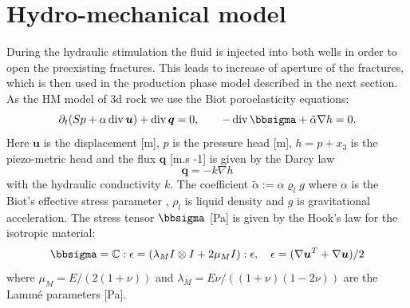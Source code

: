 \documentclass{article}
\newcommand{\CC}{\mathbb C}
\renewcommand{\div}{\operatorname{div}}
\newcommand{\eq}[1]{\begin{equation}#1\end{equation}}
\newcommand{\uu}{\vc u}
\newcommand{\vc}[1]{\boldsymbol{#1}}
\begin{document}
\section{Hydro-mechanical model}
\label{sc:hm_model}
During the hydraulic stimulation the fluid is injected into both wells in order to open the preexisting fractures. This leads to increase of aperture of the fractures, which is then used in the production phase model described in the next section. As the HM model of 3d rock we use the Biot poroelasticity equations:
\eq{\label{eq:biot} \partial_t(Sp + \alpha\div\uu) +\div\vc q = 0,\qquad -\div\bbsigma + \tilde\alpha\nabla h = 0. }
Here $\uu$ is the displacement [m], $p$ is the pressure head [m], $h=p+x_3$ is the piezo-metric head and the flux $\vc q$ [m.s -1] is given by the Darcy law
\eq{ \vc q = - k\nabla h}
with the hydraulic conductivity $k$. The coefficient $\tilde\alpha:=\alpha\varrho_l g$ where $\alpha$ is the Biot's effective stress parameter \cite{Biot1941},
$\rho_l$ is liquid density and $g$ is gravitational acceleration.
The stress tensor $\bbsigma$ [Pa] is given by the Hook's law
for the isotropic material:
\eq{ \bbsigma = \CC : \epsilon 
= (\lambda_M I\otimes I +2\mu_M I):\epsilon, \quad \epsilon = (\nabla \uu^T + \nabla \uu)/2}
where $\mu_M=E/(2(1+\nu))$ and $\lambda_M=E\nu/((1+\nu)(1-2\nu))$
are the Lammé parameters [Pa].
\end{document}
